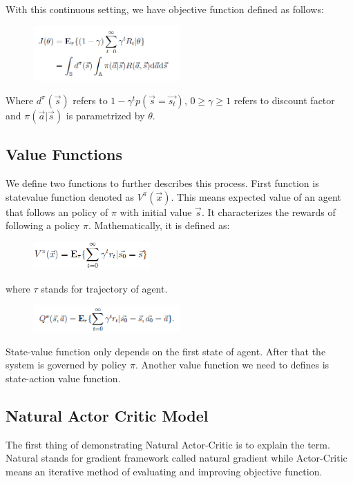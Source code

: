 \documentclass[officiallayout]{tktla}
\begin{document}
With this continuous setting, we have objective function defined as follows:
\begin{figure}[h!]

  \centering
    \includegraphics[width=0.5\textwidth]{objective_func}
\end{figure}

Where $d^\pi(\vec{s})$ refers to $1 - \gamma^tp(\vec{s} = \vec{s_t})$, $0 \geq \gamma \geq 1$ refers to discount factor and $\pi(\vec{a}|\vec{s})$ is parametrized by $\theta$.
\subsection{Value Functions}
We define two functions to further describes this process. First function is statevalue
function denoted as $V^\pi(\vec{x})$. This means expected value of an agent that follows
an policy of $\pi$ with initial value $\vec{s}$. It characterizes the rewards of following a policy $\pi$. Mathematically, it is defined as:

\begin{figure}[h!]
  \centering
    \includegraphics[width=0.4\textwidth]{value1}
\end{figure}
where $\tau$ stands for trajectory of agent.
\begin{figure}[h!]
  \centering
    \includegraphics[width=0.5\textwidth]{value2}
\end{figure}
State-value function only depends on the first state of agent. After that the system
is governed by policy $\pi$. Another value function we need to defines is state-action
value function.
\subsection{Natural Actor Critic Model}
The first thing of demonstrating Natural Actor-Critic is to explain the term. Natural
stands for gradient framework called natural gradient while Actor-Critic means an
iterative method of evaluating and improving objective function.
\end{document}
